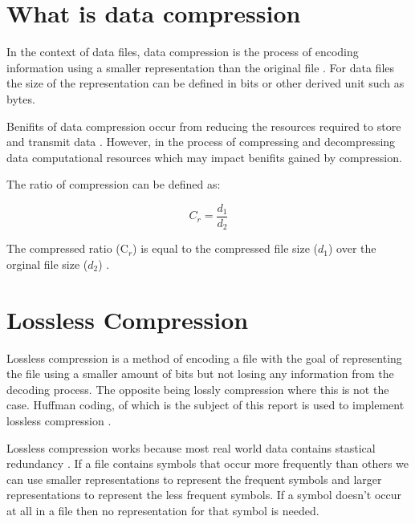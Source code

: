 

\section{What is data compression}


\singlespacing
In the context of data files, data compression is the process of encoding information using a smaller representation than the original file \cite{WikiDataCompression}. For data files the size of the representation can be defined in bits or other derived unit such as bytes.


\doublespacing
\singlespacing
Benifits of data compression occur from reducing the resources required to store and transmit data \cite{WikiDataCompression}. However, in the process of compressing and decompressing data computational resources which may impact benifits gained by compression.


\doublespacing
\singlespacing
The ratio of compression can be defined as:


\begin{equation*}
  C_{r} = \dfrac{d_{1}}{d_{2}}
\end{equation*}


\doublespacing
\singlespacing
The compressed ratio (C$_{r}$) is equal to the compressed file size ($d_{1}$) over the orginal file size ($d_{2}$) \cite{MasseyStudyGuide}.


\doublespacing
\singlespacing
\section{Lossless Compression}


\singlespacing


Lossless compression is a method of encoding a file with the goal of representing the file using a smaller amount of bits but not losing any information from the decoding process. The opposite being lossly compression where this is not the case. Huffman coding, of which is the subject of this report is used to implement lossless compression \cite{WikiHuffman}.


\doublespacing
\singlespacing
Lossless compression works because most real world data contains stastical redundancy \cite{WikiDataCompression}. If a file contains symbols that occur more frequently than others we can use smaller representations to represent the frequent symbols and larger representations to represent the less frequent symbols. If a symbol doesn't occur at all in a file then no representation for that symbol is needed.


